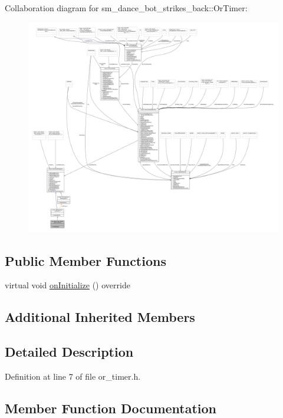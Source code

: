 Collaboration diagram for sm\+\_\+dance\+\_\+bot\+\_\+strikes\+\_\+back\+:\+:Or\+Timer\+:
\nopagebreak
\begin{figure}[H]
\begin{center}
\leavevmode
\includegraphics[width=350pt]{classsm__dance__bot__strikes__back_1_1OrTimer__coll__graph}
\end{center}
\end{figure}
\subsection*{Public Member Functions}
\begin{DoxyCompactItemize}
\item 
virtual void \hyperlink{classsm__dance__bot__strikes__back_1_1OrTimer_a89c7a3040c7d44d877d8b85b89883cb1}{on\+Initialize} () override
\end{DoxyCompactItemize}
\subsection*{Additional Inherited Members}


\subsection{Detailed Description}


Definition at line 7 of file or\+\_\+timer.\+h.



\subsection{Member Function Documentation}
